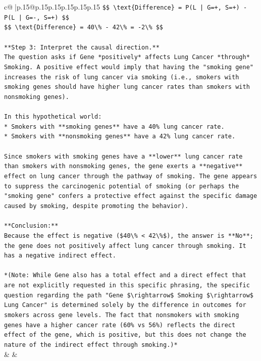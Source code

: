 \documentclass{article}
\begin{document}
{\begin{supertabular}{c@{$\;$}|p{.15\linewidth}@{}p{.15\linewidth}p{.15\linewidth}p{.15\linewidth}p{.15\linewidth}p{.15\linewidth}}
{{{\texttt{\$\$ \textbackslash{}text\{Difference\} = P(L | G=+, S=+) {-} P(L | G={-}, S=+) \$\$} \\
\texttt{\$\$ \textbackslash{}text\{Difference\} = 40\textbackslash{}\% {-} 42\textbackslash{}\% = {-}2\textbackslash{}\% \$\$} \\
\\ 
\texttt{**Step 3: Interpret the causal direction.**} \\
\texttt{The question asks if Gene *positively* affects Lung Cancer *through* Smoking. A positive effect would imply that having the "smoking gene" increases the risk of lung cancer via smoking (i.e., smokers with smoking genes should have higher lung cancer rates than smokers with nonsmoking genes).} \\
\\ 
\texttt{In this hypothetical world:} \\
\texttt{*   Smokers with **smoking genes** have a 40\% lung cancer rate.} \\
\texttt{*   Smokers with **nonsmoking genes** have a 42\% lung cancer rate.} \\
\\ 
\texttt{Since smokers with smoking genes have a **lower** lung cancer rate than smokers with nonsmoking genes, the gene exerts a **negative** effect on lung cancer through the pathway of smoking. The gene appears to suppress the carcinogenic potential of smoking (or perhaps the "smoking gene" confers a protective effect against the specific damage caused by smoking, despite promoting the behavior).} \\
\\ 
\texttt{**Conclusion:**} \\
\texttt{Because the effect is negative (\$40\textbackslash{}\% < 42\textbackslash{}\%\$), the answer is **No**; the gene does not positively affect lung cancer through smoking. It has a negative indirect effect.} \\
\\ 
\texttt{*(Note: While Gene also has a total effect and a direct effect that are not explicitly requested in this specific phrasing, the specific question regarding the path "Gene \$\textbackslash{}rightarrow\$ Smoking \$\textbackslash{}rightarrow\$ Lung Cancer" is determined solely by the difference in outcomes for smokers across gene levels. The fact that nonsmokers with smoking genes have a higher cancer rate (60\% vs 56\%) reflects the direct effect of the gene, which is positive, but this does not change the nature of the indirect effect through smoking.)*} \\
            }
        }
    }
    & & \\ \\


\end{supertabular}}
\end{document}
